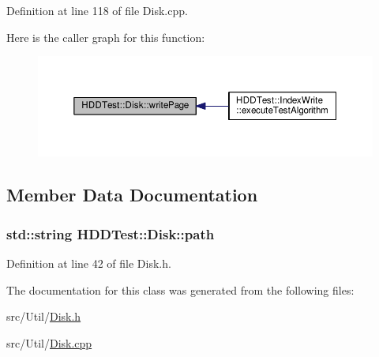 Definition at line 118 of file Disk.\-cpp.



Here is the caller graph for this function\-:
\nopagebreak
\begin{figure}[H]
\begin{center}
\leavevmode
\includegraphics[width=350pt]{class_h_d_d_test_1_1_disk_a538c61b9ff956231d7f05d19419eada1_icgraph}
\end{center}
\end{figure}




\subsection{Member Data Documentation}
\hypertarget{class_h_d_d_test_1_1_disk_ac8e5dd8530a2f2913a8d1f25013549a4}{
\subsubsection[{path}]{\setlength{\rightskip}{0pt plus 5cm}std\-::string H\-D\-D\-Test\-::\-Disk\-::path}}\label{class_h_d_d_test_1_1_disk_ac8e5dd8530a2f2913a8d1f25013549a4}


Definition at line 42 of file Disk.\-h.



The documentation for this class was generated from the following files\-:\begin{DoxyCompactItemize}
\item 
src/\-Util/\hyperlink{_disk_8h}{Disk.\-h}\item 
src/\-Util/\hyperlink{_disk_8cpp}{Disk.\-cpp}\end{DoxyCompactItemize}
